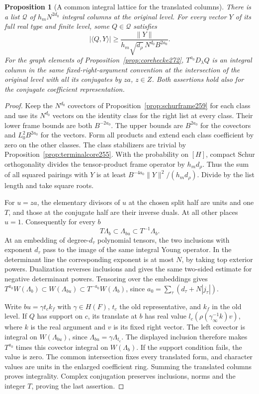 \documentclass[a4paper,11pt]{article}
\newtheorem{proposition}{Proposition}[section]
\theoremstyle{definition}
\theoremstyle{remark}
\numberwithin{equation}{section}
\begin{document}
\begin{proposition}[A common integral lattice for the translated columns]\leavevmode
\label{prop:corelattice272}
There is a list \(\mathcal Q\) of \(h_mN^{2d_0}\) integral
columns at the original level. For every vector \(Y\) of its
full real type and finite level, some \(Q\in\mathcal Q\) satisfies
\[
       |\langle Q,Y\rangle|\ge
       \frac{\|Y\|}{h_m\sqrt{d_\rho}\,N^{d_0} B^{2a_0}} .
\]
For the graph elements of Proposition~\ref{prop:corehecke272},
\(T^{a_0}D_\lambda Q\) is an integral column in the same
fixed-right-argument convention at the intersection of the
original level with all its conjugates by \(za\), \(z\in Z\).
Both assertions hold also for the conjugate coefficient representation.
\end{proposition}
\begin{proof}
Keep the \(N^{d_0}\) covectors of
Proposition~\ref{prop:schurframe259} for each class and use its
\(N^{d_0}\) vectors on the identity class for the right list at
every class. Their lower frame bounds are both \(B^{-2a_0}\).
The upper bounds are \(B^{2a_0}\) for the covectors and
\(L_0^2B^{2a_0}\) for the vectors. Form all products and extend
each class coefficient by zero on the other classes. The class
stabilizers are trivial by Proposition~\ref{prop:terminalcore255}.
With the probability on \([H]\), compact Schur orthogonality
divides the tensor-product frame operator by \(h_m d_\rho\).
Thus the sum of all squared pairings with \(Y\) is at least
\(B^{-4a_0}\|Y\|^2/(h_m d_\rho)\). Divide by the list length
and take square roots.

For \(u=za\), the elementary divisors of \(u\) at the chosen
split half are units and one \(T\), and those at the conjugate
half are their inverse duals. At all other places \(u=1\).
Consequently for every \(b\)
\[
          T\Lambda_b\subset\Lambda_{bu}\subset T^{-1}\Lambda_b .
\]
At an embedding of degree-\(d_\tau\) polynomial tensors, the
two inclusions with exponent \(d_\tau\) pass to the image of
the same integral Young operator. In the determinant line the
corresponding exponent is at most \(N\), by taking top
exterior powers. Dualization reverses inclusions and gives
the same two-sided estimate for negative determinant powers.
Tensoring over the embeddings gives
\(T^{a_0}W(\Lambda_b)\subset W(\Lambda_{bu})
\subset T^{-a_0}W(\Lambda_b)\), since
\(a_0=\sum_\tau(d_\tau+N|j_\tau|)\).

Write \(bu=\gamma t_c k_f\) with \(\gamma\in H(F)\), \(t_c\)
the old representative, and \(k_f\) in the old level. If
\(Q\) has support on \(c\), its translate at \(b\) has real
value \(l_c(\rho(\gamma_\infty^{-1}k)v)\), where \(k\)
is the real argument and \(v\) is its fixed right vector.
The left covector is integral on \(W(\Lambda_{bu})\), since
\(\Lambda_{bu}=\gamma\Lambda_{t_c}\). The displayed inclusion
therefore makes \(T^{a_0}\) times this covector integral on
\(W(\Lambda_b)\). If the support condition fails, the value
is zero. The common intersection fixes every translated form,
and character values are units in the enlarged coefficient
ring. Summing the translated columns proves integrality.
Complex conjugation preserves inclusions, norms and the
integer \(T\), proving the last assertion.
\end{proof}
\end{document}
